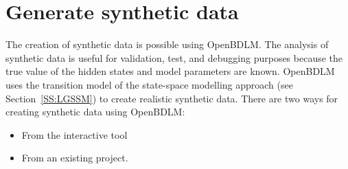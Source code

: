 \section{Generate synthetic data}
\label{S:SYNTHETIC}
The creation of synthetic data is possible using OpenBDLM.
The analysis of synthetic data is useful for validation, test, and debugging purposes because the true value of the hidden states and model parameters are known.
OpenBDLM uses the transition model  of the state-space modelling approach (see Section~\ref{SS:LGSSM}) to create realistic synthetic data.
There are two ways for creating synthetic data using OpenBDLM:

\begin{itemize}
\item From the interactive tool
\item From an existing project.
\end{itemize}

